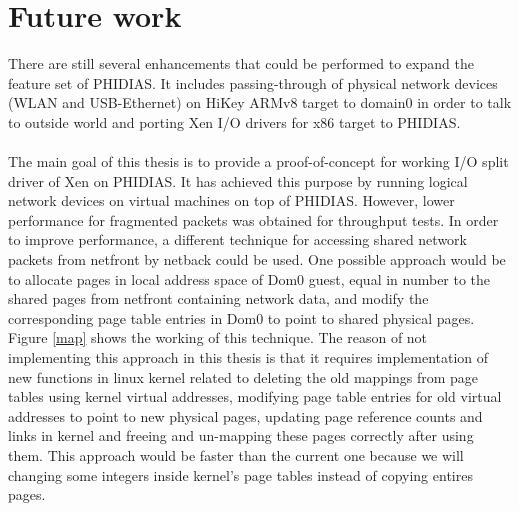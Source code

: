 \section{Future work \label{sec:Futurework}}
There are still several enhancements that could be performed to expand the feature set of PHIDIAS. It includes passing-through of physical network devices (WLAN and USB-Ethernet) on HiKey ARMv8 target to domain0 in order to talk to outside world and porting Xen I/O drivers for x86 target to PHIDIAS.
\\
\\
The main goal of this thesis is to provide a proof-of-concept for working I/O split driver of Xen on PHIDIAS. It has achieved this purpose by running logical network devices on virtual machines on top of PHIDIAS. However, lower performance for fragmented packets was obtained for throughput tests. In order to improve performance, a different technique for accessing shared network packets from netfront by netback could be used. One possible approach would be to allocate pages in local address space of Dom0 guest, equal in number to the shared pages from netfront containing network data, and modify the corresponding page table entries in Dom0 to point to shared physical pages. Figure \ref{map} shows the working of this technique. The reason of not implementing this approach in this thesis is that it requires implementation of new functions in linux kernel related to deleting the old mappings from page tables using kernel virtual addresses, modifying page table entries for old virtual addresses to point to new physical pages, updating page reference counts and links in kernel and freeing and un-mapping these pages correctly after using them. This approach would be faster than the current one because we will changing some integers inside kernel's page tables instead of copying entires pages.


